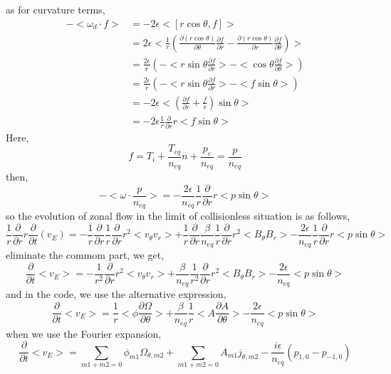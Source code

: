 \documentclass[11pt,a4paper]{article}
\begin{document}
	as for curvature terms,
	\begin{equation}
	\begin{aligned}
		-<\omega_d\cdot{f}>
		&=-2\epsilon<[r\cos\theta,f]>	\\
		&=2\epsilon<\frac{1}{r}(\frac{\partial(r\cos\theta)}{\partial\theta}\frac{\partial{f}}{\partial{r}}-\frac{\partial(r\cos\theta)}{\partial{r}}\frac{\partial{f}}{\partial\theta})>	\\
		&=\frac{2\epsilon}{r}(-<r\sin\theta\frac{\partial{f}}{\partial{r}}>-<\cos\theta\frac{\partial{f}}{\partial\theta}>)	\\
		&=\frac{2\epsilon}{r}(-<r\sin\theta\frac{\partial{f}}{\partial{r}}>-<f\sin\theta>)	\\
		&=-2\epsilon<(\frac{\partial{f}}{\partial{r}}+\frac{f}{r})\sin\theta>\\
		&=-2\epsilon\frac{1}{r}\frac{\partial}{\partial{r}}r<f\sin\theta>
	\end{aligned}
	\end{equation}
	Here,
	\begin{equation}
		f=T_i+\frac{T_{eq}}{n_{eq}}n+\frac{p_e}{n_{eq}}=\frac{p}{n_{eq}}
	\end{equation} 
	then,
	\begin{equation}
		-<\omega\cdot{\frac{p}{n_{eq}}}>=-\frac{2\epsilon}{n_{eq}}\frac{1}{r}\frac{\partial}{\partial{r}}r<p\sin\theta>
	\end{equation}
	so the evolution of zonal flow in the limit of collisionless situation is as follows,
	\begin{equation}
		\frac{1}{r}\frac{\partial}{\partial{r}}r\frac{\partial}{\partial{t}}({v_E})
		=-\frac{1}{r}\frac{\partial}{\partial{r}}  \frac{1}{r}\frac{\partial}{\partial{r}}r^2<v_\theta{v_r}>
		+\frac{1}{r}\frac{\partial}{\partial{r}} 
		\frac{\beta}{n_{eq}}\frac{1}{r}\frac{\partial}{\partial{r}}r^2<B_\theta{B_r}>
		-\frac{2\epsilon}{n_{eq}}\frac{1}{r}\frac{\partial}{\partial{r}}r<p\sin\theta>
	\end{equation}
	eliminate the commom part, we get,
	\begin{equation}
		\frac{\partial}{\partial{t}}<v_E>
		=-\frac{1}{r^2}\frac{\partial}{\partial{r}}r^2<v_\theta{v_r}>
		+\frac{\beta}{n_{eq}}\frac{1}{r^2}\frac{\partial}{\partial{r}}r^2<B_\theta{B_r}>
		-\frac{2\epsilon}{n_{eq}}<p\sin\theta>
	\end{equation} 
	and in the code, we use the alternative expression,
	\begin{equation}
		\frac{\partial}{\partial{t}}<v_E>
		=\frac{1}{r}<\phi\frac{\partial{\Omega}}{\partial\theta}>
		+\frac{\beta}{n_{eq}}\frac{1}{r}<A\frac{\partial{A}}{\partial\theta}>
		-\frac{2\epsilon}{n_{eq}}<p\sin\theta>
	\end{equation} 
	when we use the Fourier expansion,
	\begin{equation}
		\frac{\partial}{\partial{t}}<v_E>
		=\sum_{m1+m2=0}{\phi_{m1}}{\Omega_{\theta,m2}}
		+\sum_{m1+m2=0}{A_{m1}}{j_{\theta,m2}}
		-\frac{i\epsilon}{n_{eq}}(p_{1,0}-p_{-1,0})
	\end{equation}
	
\end{document}
